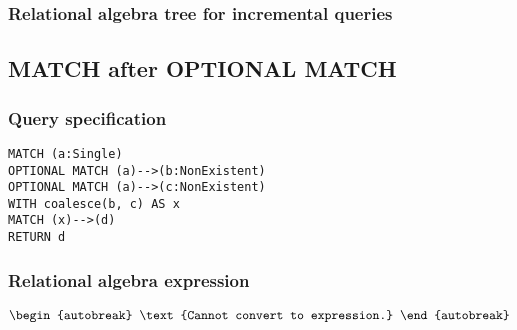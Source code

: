 \subsubsection*{Relational algebra tree for incremental queries}


\subsection{MATCH after OPTIONAL MATCH}

\subsubsection*{Query specification}

\begin{lstlisting}
MATCH (a:Single)
OPTIONAL MATCH (a)-->(b:NonExistent)
OPTIONAL MATCH (a)-->(c:NonExistent)
WITH coalesce(b, c) AS x
MATCH (x)-->(d)
RETURN d
\end{lstlisting}

\subsubsection*{Relational algebra expression}

\begin{align*}
\begin{autobreak}
\text{Cannot convert to expression.}
\end{autobreak}
\end{align*}

